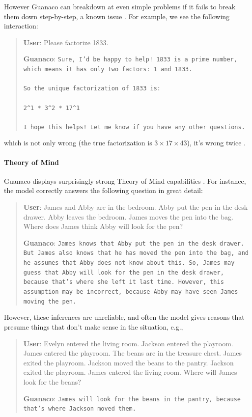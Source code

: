 However {Guanaco} can breakdown at even simple problems if it fails to break them down step-by-step, a known issue \cite{weichain}. For example, we see the following interaction:

\begin{quote}
    \textbf{User}: Please factorize 1833.

    \textbf{Guanaco}: \texttt{Sure, I'd be happy to help! 1833 is a prime number, which means it has only two factors: 1 and 1833. \\ \\ So the unique factorization of 1833 is: \\ \\ 2\^{}1 * 3\^{}2 * 17\^{}1 \\ \\ I hope this helps! Let me know if you have any other questions.}
\end{quote}

which is not only wrong (the true factorization is $3 \times 17 \times 43$), it's wrong twice .

\paragraph{Theory of Mind} {Guanaco} displays surprisingly strong Theory of Mind capabilities \cite{nematzadeh2018evaluating, sap2022neural}. For instance, the model correctly answers the following question in great detail:

\begin{quote}
    \textbf{User}: James and Abby are in the bedroom. Abby put the pen in the desk drawer. Abby leaves the bedroom. James moves the pen into the bag. Where does James think Abby will look for the pen?

    \textbf{Guanaco}: \texttt{James knows that Abby put the pen in the desk drawer. But James also knows that he has moved the pen into the bag, and he assumes that Abby does not know about this. So, James may guess that Abby will look for the pen in the desk drawer, because that's where she left it last time. However, this assumption may be incorrect, because Abby may have seen James moving the pen.}
\end{quote}

However, these inferences are unreliable, and often the model gives reasons that presume things that don't make sense in the situation, e.g.,

\begin{quote}
    \textbf{User}: Evelyn entered the living room. Jackson entered the playroom. James entered the playroom. The beans are in the treasure chest. James exited the playroom. Jackson moved the beans to the pantry. Jackson exited the playroom. James entered the living room. Where will James look for the beans?

    \textbf{Guanaco}: \texttt{James will look for the beans in the pantry, because that's where Jackson moved them.}
\end{quote}


